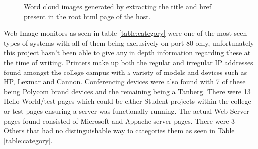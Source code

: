 \documentclass[a4wide,leqno,12pt]{report}
\begin{document}
\begin{figure}[H]
  \centering
  \hfill
  \hfill
  \hfill
  \caption{Word cloud images generated by extracting the title and href present in the root html page of the host.}
\end{figure}


Web Image monitors as seen in table \ref{table:category} were one of the most seen types of systems with all of them being exclusively on port 80 only, unfortunately this project hasn't been able to give any in depth information regarding these at the time of writing. Printers make up both the regular and irregular IP addresses found amongst the college campus with a variety of models and devices such as HP, Lexmar and Cannon. Conferencing devices were also found with 7 of these being Polycom brand devices\cite{polycom} and the remaining being a Tanberg. There were 13 Hello World/test pages which could be either Student projects within the college or test pages ensuring a server was functionally running. The actual Web Server pages  found consisted of Microsoft and Appache server pages. There were 3 Others that had no distinguishable way to categories them as seen in Table \ref{table:category}. 
\end{document}
